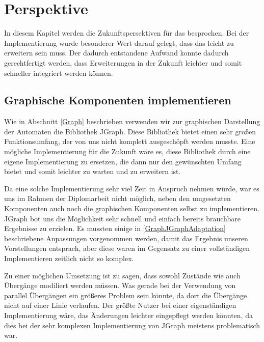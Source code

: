 

\chapter{Perspektive}\label{Perspective}

In diesem Kapitel werden die Zukunftspersektiven für das \gtitool besprochen.
Bei der Implementierung wurde besonderer Wert darauf gelegt, dass das \gtitool
leicht zu erweitern sein muss. Der dadurch entstandene Aufwand konnte dadurch
gerechtfertigt werden, dass Erweiterungen in der Zukunft leichter und somit
schneller integriert werden können.


\section{Graphische Komponenten implementieren}\label{PerspectiveGraphics}

Wie in Abschnitt \ref{Graph} beschrieben verwenden wir zur graphischen
Darstellung der Automaten die Bibliothek JGraph. Diese Bibliothek bietet einen
sehr großen Funktionsumfang, der von uns nicht komplett ausgeschöpft werden
musste. Eine mögliche Implementierung für die Zukunft wäre es, diese Bibliothek
durch eine eigene Implementierung zu ersetzen, die dann nur den gewünschten
Umfang bietet und somit leichter zu warten und zu erweitern ist.\vspace{10pt}

Da eine solche Implementierung sehr viel Zeit in Anspruch nehmen würde, war es
uns im Rahmen der Diplomarbeit nicht möglich, neben den umgesetzten Komponenten
auch noch die graphischen Komponenten selbst zu implementieren. JGraph bot uns
die Möglichkeit sehr schnell und einfach bereits brauchbare Ergebnisse zu
erzielen. Es mussten einige in \ref{GraphJGraphAdaptation} beschriebene
Anpassungen vorgenommen werden, damit das Ergebnis unseren Vorstellungen
entsprach, aber diese waren im Gegensatz zu einer vollständigen Implementieren
zeitlich nicht so komplex.\vspace{10pt}

Zu einer möglichen Umsetzung ist zu sagen, dass sowohl Zustände wie auch
Übergänge modiliert werden müssen. Was gerade bei der Verwendung von parallel
Übergängen ein größeres Problem sein könnte, da dort die Übergänge nicht auf
einer Linie verlaufen. Der größte Nutzer bei einer eigenständigen
Implementierung wäre, das Änderungen leichter eingepflegt werden könnten, da
dies bei der sehr komplexen Implementierung von JGraph meistens problematisch
war.



